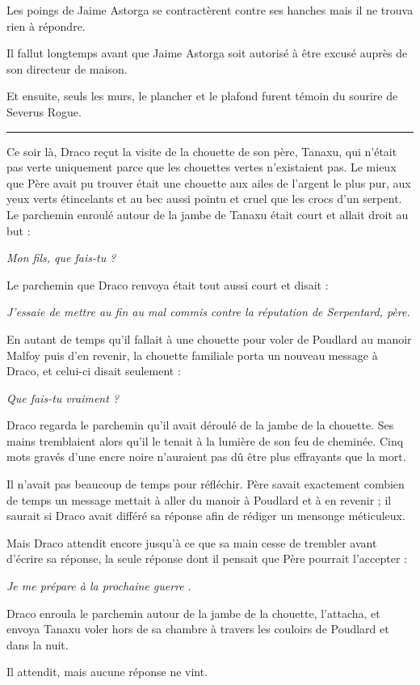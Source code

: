 Les poings de Jaime Astorga se contractèrent contre ses hanches mais il ne trouva rien à répondre.

Il fallut longtemps avant que Jaime Astorga soit autorisé à être excusé auprès de son directeur de maison.

Et ensuite, seuls les murs, le plancher et le plafond furent témoin du sourire de Severus Rogue.
\par\noindent\rule{\textwidth}{0.4pt}
Ce soir là, Draco reçut la visite de la chouette de son père, Tanaxu, qui n'était pas verte uniquement parce que les chouettes vertes n'existaient pas. Le mieux que Père avait pu trouver était une chouette aux ailes de l'argent le plus pur, aux yeux verts étincelants et au bec aussi pointu et cruel que les crocs d'un serpent. Le parchemin enroulé autour de la jambe de Tanaxu était court et allait droit au but :

\emph{Mon fils, que fais-tu ?} 

Le parchemin que Draco renvoya était tout aussi court et disait :

\emph{J'essaie de mettre au fin au mal commis contre la réputation de Serpentard, père.} 

En autant de temps qu'il fallait à une chouette pour voler de Poudlard au manoir Malfoy puis d'en revenir, la chouette familiale porta un nouveau message à Draco, et celui-ci disait seulement :

\emph{Que fais-tu vraiment ?} 

Draco regarda le parchemin qu'il avait déroulé de la jambe de la chouette. Ses mains tremblaient alors qu'il le tenait à la lumière de son feu de cheminée. Cinq mots gravés d'une encre noire n'auraient pas dû être plus effrayants que la mort.

Il n'avait pas beaucoup de temps pour réfléchir. Père savait exactement combien de temps un message mettait à aller du manoir à Poudlard et à en revenir ; il saurait si Draco avait différé sa réponse afin de rédiger un mensonge méticuleux.

Mais Draco attendit encore jusqu'à ce que sa main cesse de trembler avant d'écrire sa réponse, la seule réponse dont il pensait que Père pourrait l'accepter :

\emph{Je me prépare à la prochaine guerre} .

Draco enroula le parchemin autour de la jambe de la chouette, l'attacha, et envoya Tanaxu voler hors de sa chambre à travers les couloirs de Poudlard et dans la nuit.

Il attendit, mais aucune réponse ne vint.


